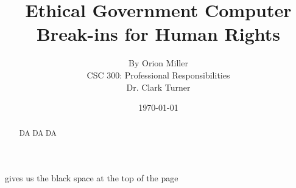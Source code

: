 \documentclass[11pt]{article}
\begin{document}
\title{\vfill Ethical Government Computer Break-ins for Human Rights} %
gives us the black space at the top of the page \author{ By Orion
  Miller\vspace{10pt} \\ CSC 300: Professional Responsibilities\vspace{10pt} \\
  Dr. Clark Turner\vspace{10pt} \\ }
\date{\today}

\maketitle

\vfill  %
\begin{abstract} DA DA DA\end{abstract}

\thispagestyle{empty} %


\thispagestyle{empty}  %

\newpage

\end{document}
